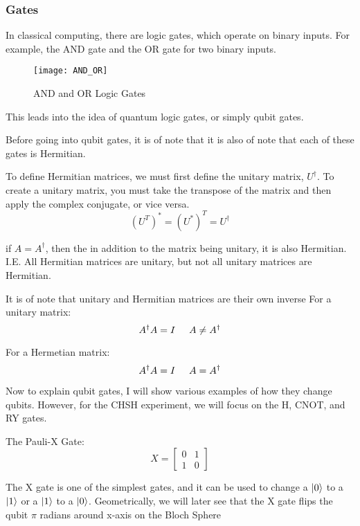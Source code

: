 \documentclass[12pt]{article}
\begin{document}
\subsubsection{Gates}

In classical computing, there are logic gates, which operate on binary inputs. For example, the AND gate and the OR gate for two binary inputs. 

\begin{figure}[h]
    \centering
    \texttt{[image: AND\_OR]}
    \caption{AND and OR Logic Gates}
    \cite{AND_OR_Logic_Gates}
    \label{fig:AND_OR}
\end{figure}

This leads into the idea of quantum logic gates, or simply qubit gates.\cite{Quantum_Information} 

Before going into qubit gates, it is of note that it is also of note that each of these gates is Hermitian.


To define Hermitian matrices, we must first define the unitary matrix, $U^\dagger$. To create a unitary matrix, you must take the transpose of the matrix and then apply the complex conjugate, or vice versa.
$$
(U^{T})^{*} = (U^*)^T = U^\dagger
$$ 

if $A = A^\dagger$, then the in addition to the matrix being unitary, it is also Hermitian. I.E. All Hermitian matrices are unitary, but not all unitary matrices are Hermitian.


It is of note that unitary and Hermitian matrices are their own inverse
For a unitary matrix:
$$
A^{\dagger}A = I \hspace{0.5cm} A \neq A^{\dagger}
$$

For a Hermetian matrix:
$$
A^{\dagger}A = I \hspace{0.5cm} A = A^{\dagger}
$$


Now to explain qubit gates, I will show various examples of how they change qubits. However, for the CHSH experiment, we will focus on the H, CNOT, and RY gates.

The Pauli-X Gate:
$$
X = \begin{bmatrix}
0 & 1 \\
1 & 0
\end{bmatrix}
$$

The X gate is one of the simplest gates, and it can be used to change a $\ket{0}$ to a $\ket{1}$ or a $\ket{1}$ to a $\ket{0}$. Geometrically, we will later see that the X gate flips the qubit $\pi$ radians around x-axis on the Bloch Sphere
\end{document}
